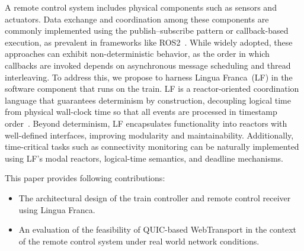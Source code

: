     A remote control system includes physical components such as sensors and actuators. Data exchange and coordination among these components are commonly implemented using the publish–subscribe pattern or callback-based execution, as prevalent in frameworks like ROS2~\cite{MacenskiFGLLW22}. While widely adopted, these approaches can exhibit non-deterministic behavior, as the order in which callbacks are invoked depends on asynchronous message scheduling and thread interleaving. To address this, we propose to harness Lingua Franca~(LF) in the software component that runs on the train. LF is a reactor-oriented coordination language that guarantees determinism by construction, decoupling logical time from physical wall-clock time so that all events are processed in timestamp order~\cite{LohstrohMBL21}. Beyond determinism, LF encapsulates functionality into reactors with well-defined interfaces, improving modularity and maintainability. Additionally, time-critical tasks such as connectivity monitoring can be naturally implemented using LF's modal reactors, logical-time semantics, and deadline mechanisms.


    This paper provides following contributions:
        \begin{itemize}
            \item The architectural design of the train controller and remote control receiver using Lingua Franca.

            \item An evaluation of the feasibility of QUIC-based WebTransport in the context of the remote control system under real world network conditions.
        \end{itemize}